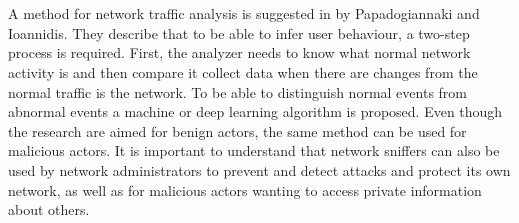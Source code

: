 \\\\
A method for network traffic analysis is suggested in \cite{NetAna} by Papadogiannaki and Ioannidis. They describe that to be able to infer user behaviour, a two-step process is required. First, the analyzer needs to know what normal network activity is and then compare it collect data when there are changes from the normal traffic is the network. To be able to distinguish normal events from abnormal events a machine or deep learning algorithm is proposed. Even though the research are aimed for benign actors, the same method can be used for malicious actors. It is important to understand that network sniffers can also be used by network administrators to prevent and detect attacks and protect its own network, as well as for malicious actors wanting to access private information about others. 